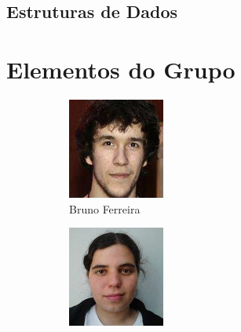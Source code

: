 \documentclass[11pt, a4paper, oneside]{article}
\begin{document}
\subsection{Estruturas de Dados}
\newpage
\section{Elementos do Grupo}
\begin{figure}[h!]
\centering
\begin{subfigure}{.33\textwidth}
  \centering
  \includegraphics[width=0.8\linewidth]{60}
  \caption{Bruno Ferreira  }
\end{subfigure}%
\begin{subfigure}{.33\textwidth}
  \centering
  \includegraphics[width=0.8\linewidth]{107}

\end{subfigure}
\end{figure}
\end{document}
